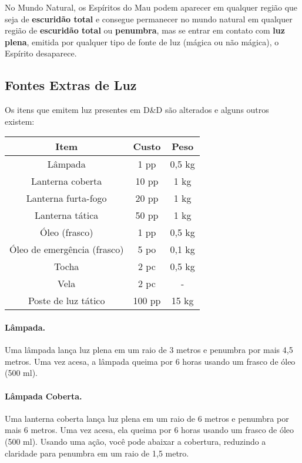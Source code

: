 \begin{multicols}{2}
No Mundo Natural, os Espíritos do Mau podem aparecer em qualquer região que seja
de \textbf{escuridão total} e consegue permanecer no mundo natural em qualquer
região de \textbf{escuridão total} ou \textbf{penumbra}, mas se entrar em
contato com \textbf{luz plena}, emitida por qualquer tipo de fonte de luz
(mágica ou não mágica), o Espírito desaparece.

\subsection{Fontes Extras de Luz}%
\label{sub:fontes_extras_de_luz}

Os itens que emitem luz presentes em D\&D são alterados e alguns outros existem:

\begin{center}
\begin{tabular}{ccc}
\textbf{Item} & \textbf{Custo} & \textbf{Peso} \\ \hline
Lâmpada & 1 pp & 0,5 kg \\
Lanterna coberta & 10 pp  & 1 kg \\
Lanterna furta-fogo & 20 pp & 1 kg \\
Lanterna tática & 50 pp & 1 kg \\
Óleo (frasco) & 1 pp & 0,5 kg \\
Óleo de emergência (frasco) & 5 po & 0,1 kg \\
Tocha & 2 pc & 0,5 kg \\
Vela & 2 pc & - \\
Poste de luz tático & 100 pp & 15 kg \\
\end{tabular}
\end{center}

\paragraph{Lâmpada.}%
\label{par:lampada}

Uma lâmpada lança luz plena em um raio de 3 metros e penumbra por mais 4,5
metros. Uma vez acesa, a lâmpada queima por 6 horas usando um frasco de óleo
(500 ml).

\paragraph{Lâmpada Coberta.}%
\label{par:lampada_coberta}

Uma lanterna coberta lança luz plena em um raio de 6 metros e penumbra por mais
6 metros. Uma vez acesa, ela queima por 6 horas usando um frasco de óleo (500
ml). Usando uma ação, você pode abaixar a cobertura, reduzindo a claridade para
penumbra em um raio de 1,5 metro.


\end{multicols}
